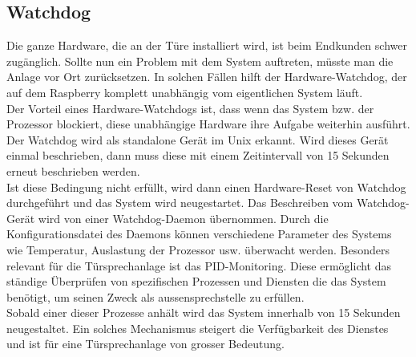 \subsection{Watchdog}
\label{kap:watchdog}
Die ganze Hardware, die an der Türe installiert wird, ist beim Endkunden schwer zugänglich. Sollte nun ein Problem mit dem System auftreten, müsste man die Anlage vor Ort zurücksetzen. In solchen Fällen hilft der Hardware-Watchdog, der auf dem Raspberry komplett unabhängig vom eigentlichen System läuft. 
\\
Der Vorteil eines Hardware-Watchdogs ist, dass wenn das System bzw. der Prozessor blockiert, diese unabhängige Hardware ihre Aufgabe weiterhin ausführt. Der Watchdog wird als standalone Gerät im Unix erkannt. Wird dieses Gerät einmal beschrieben, dann muss diese mit einem Zeitintervall von 15 Sekunden erneut beschrieben werden.
\\
Ist diese Bedingung nicht erfüllt, wird dann einen Hardware-Reset von Watchdog durchgeführt und das System wird neugestartet. Das Beschreiben vom Watchdog-Gerät wird von einer Watchdog-Daemon übernommen. Durch die Konfigurationsdatei des Daemons können verschiedene Parameter des Systems wie Temperatur, Auslastung der Prozessor usw. überwacht werden. Besonders relevant für die Türsprechanlage ist das PID-Monitoring. Diese ermöglicht das ständige Überprüfen von spezifischen Prozessen und Diensten die das System benötigt, um seinen Zweck als \gls{aussensprechstelle} zu erfüllen. 
\\
Sobald einer dieser Prozesse anhält wird das System innerhalb von 15 Sekunden neugestaltet. Ein solches Mechanismus steigert die Verfügbarkeit des Dienstes und ist für eine Türsprechanlage von grosser Bedeutung.


\newpage